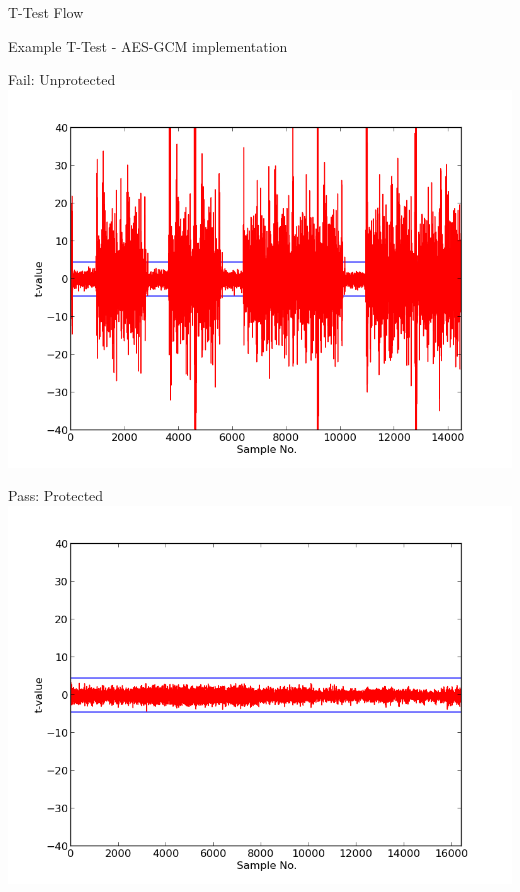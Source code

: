 \documentclass[xcolor=pdftex,dvipsnames,table,final]{beamer}
\begin{document}
\begin{frame}[fragile]{}
\begin{columns}[t]
\begin{column}{.31\linewidth}
\begin{block}{T-Test Flow}
      \end{block}
      \begin{block}{Example T-Test - AES-GCM implementation}
         \vspace{-1ex}
         \begin{minipage}{0.5\linewidth}
             \begin{center}
               Fail: Unprotected
            \includegraphics[scale=0.6]{images/aes_gcm_unprotected.png}
        \end{center} 
        \end{minipage}
        \hspace{-5ex}
       \begin{minipage}{0.5\linewidth}

        \begin{center}
             Pass: Protected
            \includegraphics[scale=0.6]{images/aes_gcm_protected.png}
            \end{center} 
         

\end{minipage}
\end{block}
\end{column}
\end{columns}
\end{frame}
\end{document}
